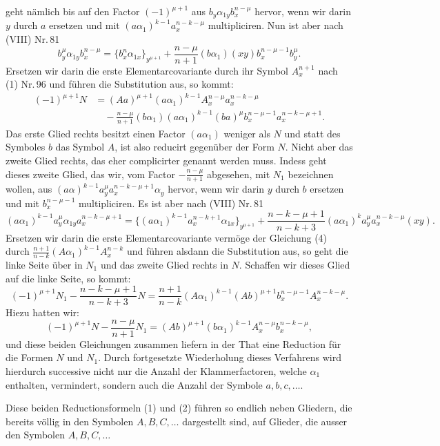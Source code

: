\documentclass[11pt]{article}
\providecommand{\weberpage}[1]{}
\providecommand{\weq}[2]{\begin{equation}\tag{#1}#2\end{equation}}
\begin{document}
\weberpage{104}
geht nämlich bis auf den Factor $(-1)^{\mu+1}$ aus $b_y\alpha_{1y}b_x^{n-\mu}$ hervor, wenn wir darin $y$ durch $a$ ersetzen und mit $(a\alpha_1)^{k-1}a_x^{n-k-\mu}$ multipliciren. Nun ist aber nach (VIII) Nr.\,81
\[
b_y^\mu \alpha_{1y} b_x^{n-\mu} = \{b_x^n \alpha_{1x}\}_{y^{\mu+1}} + \frac{n-\mu}{n+1}(b\alpha_1)(xy)b_x^{n-\mu-1}b_y^\mu.
\]
Ersetzen wir darin die erste Elementarcovariante durch ihr Symbol $A_x^{n+1}$ nach (1) Nr.\,96 und führen die Substitution aus, so kommt:
\[
\begin{aligned}
(-1)^{\mu+1} N &= (Aa)^{\mu+1}(a\alpha_1)^{k-1} A_x^{n-\mu} a_x^{n-k-\mu} \\
&\quad - \frac{n-\mu}{n+1}(b\alpha_1)(a\alpha_1)^{k-1}(ba)^\mu b_x^{n-\mu-1} a_x^{n-k-\mu+1}.
\end{aligned}
\]
Das erste Glied rechts besitzt einen Factor $(a\alpha_1)$ weniger als $N$ und statt des Symboles $b$ das Symbol $A$, ist also reducirt gegenüber der Form $N$. Nicht aber das zweite Glied rechts, das eher complicirter genannt werden muss. Indess geht dieses zweite Glied, das wir, vom Factor $-\frac{n-\mu}{n+1}$ abgesehen, mit $N_1$ bezeichnen wollen, aus $(a\alpha)^{k-1} a_y^\mu a_x^{n-k-\mu+1}\alpha_y$ hervor, wenn wir darin $y$ durch $b$ ersetzen und mit $b_x^{n-\mu-1}$ multipliciren. Es ist aber nach (VIII) Nr.\,81
\[
(a\alpha_1)^{k-1} a_y^\mu \alpha_{1y} a_x^{n-k-\mu+1} = \{(a\alpha_1)^{k-1} a_x^{n-k+1} \alpha_{1x}\}_{y^{\mu+1}} + \frac{n-k-\mu+1}{n-k+3}(a\alpha_1)^k a_y^\mu a_x^{n-k-\mu}(xy).
\]
Ersetzen wir darin die erste Elementarcovariante vermöge der Gleichung (4) durch $\frac{n+1}{n-k}(A\alpha_1)^{k-1}A_x^{n-k}$ und führen alsdann die Substitution aus, so geht die linke Seite über in $N_1$ und das zweite Glied rechts in $N$. Schaffen wir dieses Glied auf die linke Seite, so kommt:
\weq{1}{(-1)^{\mu+1} N_1 - \frac{n-k-\mu+1}{n-k+3} N = \frac{n+1}{n-k}(A\alpha_1)^{k-1}(Ab)^{\mu+1} b_x^{n-\mu-1} A_x^{n-k-\mu}.}
Hiezu hatten wir:
\weq{2}{(-1)^{\mu+1} N - \frac{n-\mu}{n+1} N_1 = (Ab)^{\mu+1}(b\alpha_1)^{k-1} A_x^{n-\mu} b_x^{n-k-\mu},}
und diese beiden Gleichungen zusammen liefern in der That eine Reduction für die Formen $N$ und $N_1$. Durch fortgesetzte Wiederholung dieses Verfahrens wird hierdurch successive nicht nur die Anzahl der Klammerfactoren, welche $\alpha_1$ enthalten, vermindert, sondern auch die Anzahl der Symbole $a, b, c,\ldots$.

Diese beiden Reductionsformeln (1) und (2) führen so endlich neben Gliedern, die bereits völlig in den Symbolen $A, B, C,\ldots$ dargestellt sind, auf Glieder, die ausser den Symbolen $A, B, C,\ldots$
\end{document}
